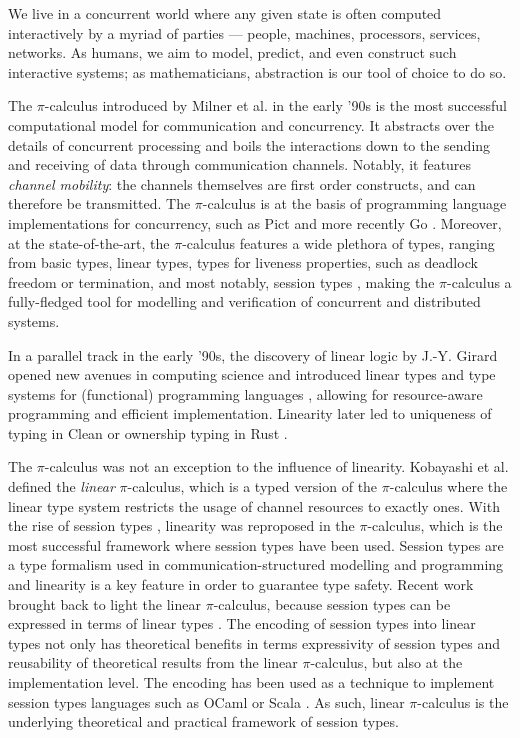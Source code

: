 \documentclass[a4paper,UKenglish,cleveref, autoref, thm-restate,authorcolumns]{lipics-v2019}
\theoremstyle{definition}
\newcommand{\picalc}{$\pi$-calculus}
\begin{document}
We live in a concurrent world where any given state is often computed interactively by a myriad of parties --- people, machines, processors, services, networks.
As humans, we aim to model, predict, and even construct such interactive systems; as mathematicians, abstraction is our tool of choice to do so.

The \picalc{} introduced by Milner et al. in the early '90s \cite{MilnerPW92,Milner99} is the most successful computational model for communication and concurrency.
It abstracts over the details of concurrent processing and boils the interactions down to the sending and receiving of data through communication channels.
Notably, it features \emph{channel mobility}: the channels themselves are first order constructs, and can therefore be transmitted.
The \picalc{} is at the basis of programming language implementations for concurrency, such as Pict \cite{Pierce} and more recently Go \cite{Golang}.
Moreover, at the state-of-the-art, the \picalc{} features a wide plethora of types, ranging from basic types, linear types, types for liveness properties, such as deadlock freedom or termination, and most notably, session types \cite{K07}, making the \picalc{} a fully-fledged tool for modelling and verification of concurrent and distributed systems.

In a parallel track in the early '90s, the discovery of linear logic by J.-Y. Girard \cite{Girard87} opened new avenues in computing science and introduced linear types and type systems for (functional) programming languages \cite{Curry-Howard,Wadler90,Bernardy2018}, allowing for resource-aware programming and efficient implementation.
Linearity later led to uniqueness of typing in Clean \cite{BarendsenS96} or ownership typing in Rust \cite{MatsakisK14}.

The \picalc{} was not an exception to the influence of linearity.
Kobayashi et al. \cite{KPT96} defined the \emph{linear} \picalc{}, which is a typed version of the \picalc{} where the linear type system restricts the usage of channel resources to exactly ones.
%
With the rise of session types \cite{H93,THK94,HVK98}, linearity was reproposed in the \picalc{}, which is
the most successful framework where session types have been used.
Session types are a type formalism used in communication-structured modelling and programming and linearity is a key feature in order to guarantee type safety.
Recent work brought back to light the linear \picalc{}, because session types can be expressed in terms of linear types \cite{DardhaGS12,DardhaGS17}.
The encoding of session types into linear types not only has theoretical benefits in terms expressivity of session types and reusability of theoretical results from the linear \picalc{}, but also at the implementation level.
The encoding has been used as a technique to implement session types languages such as OCaml \cite{Padovani17} or Scala \cite{ScalasY16,ScalasDHY17}.
As such, linear \picalc{} is the underlying theoretical and practical framework of session types.
\end{document}
